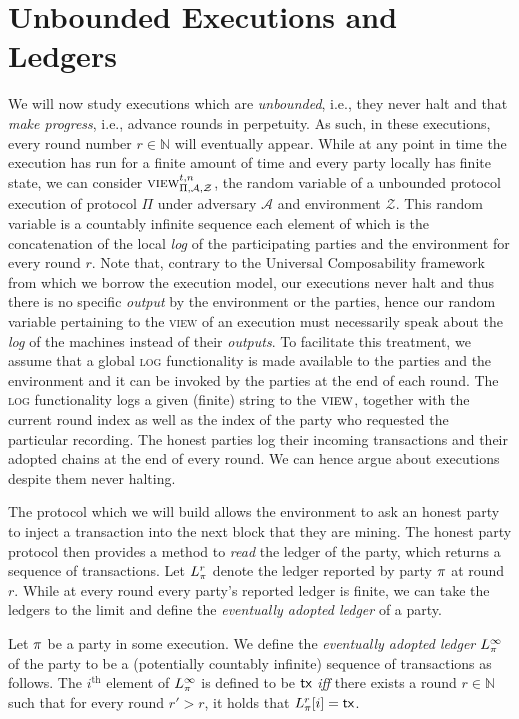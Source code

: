 \section{Unbounded Executions and Ledgers}

We will now study executions which are \emph{unbounded}, i.e., they never halt
and that \emph{make progress}, i.e., advance rounds in perpetuity. As such, in
these executions, every round number $r \in \mathbb{N}$ will eventually appear.
While at any point in time the execution has run for a finite amount of time and
every party locally has finite state, we can consider
$\textsc{view}^{t,n}_{\Pi,\mathcal{A},\mathcal{Z}}$, the random variable of a
unbounded protocol execution of protocol $\Pi$ under adversary $\mathcal{A}$ and
environment $\mathcal{Z}$. This random variable is a countably infinite sequence
each element of which is the concatenation of the local \emph{log} of the
participating parties and the environment for every round $r$. Note that,
contrary to the Universal Composability framework~\cite{FOCS:Canetti01} from
which we borrow the execution model, our
executions never halt and thus there is no specific \emph{output} by the
environment or the parties, hence our random variable pertaining to the
\textsc{view} of an execution must necessarily speak about the \emph{log} of the
machines instead of their \emph{outputs}. To facilitate this treatment, we
assume that a global \textsc{log} functionality is made available to the parties
and the environment and it can be invoked by the parties at the end of each
round. The \textsc{log} functionality logs a given (finite) string to the
$\textsc{view}$, together with the current round index as well as the index of
the party who requested the particular recording. The honest parties log their
incoming transactions and their adopted chains at the end of every round. We can
hence argue about executions despite them never halting.

The protocol which we will build allows the environment to ask an honest party
to inject a transaction into the next block that they are mining. The honest
party protocol then provides a method to \emph{read} the ledger of the party,
which returns a sequence of transactions. Let $L_\pi^r$ denote the
ledger reported by party $\pi$ at round $r$. While at every round every
party's reported ledger is finite, we can take the ledgers to the limit and
define the \emph{eventually adopted ledger} of a party.

\begin{definition}
  Let $\pi$ be a party in some execution. We define the \emph{eventually
  adopted ledger} $L_\pi^\infty$ of the party to be
  a (potentially countably infinite) sequence of transactions as follows. The
  $i^\text{th}$ element of $L_\pi^\infty$ is defined to be $\textsf{tx}$
  \emph{iff} there exists a round $r \in \mathbb{N}$ such that for every round
  $r' > r$, it holds that $L_\pi^r[i] = \textsf{tx}$.
\end{definition}

